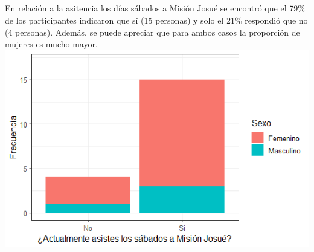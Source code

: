 \documentclass{beamer}
\begin{document}
\subsection{}
\begin{frame}{}
\vspace{-0.9\baselineskip}
\begin{tcolorbox}[colback=backframe_color,colframe=beamer_color,title=] 
En relación a la asitencia los días sábados a Misión Josué se encontró que el 79\% de los participantes indicaron que sí (15 personas) y solo el 21\% respondió que no (4 personas). Además, se puede apreciar que para ambos casos la proporción de mujeres es mucho mayor. 
\includegraphics[width=0.8\linewidth]{special_figures/Rplot03.png}
    
\end{tcolorbox}
\end{frame}






\end{document}
